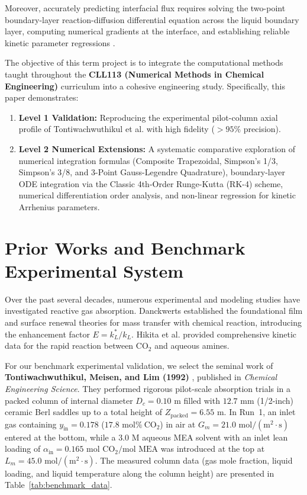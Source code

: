 \documentclass[11pt,a4paper]{article}
\begin{document}
Moreover, accurately predicting interfacial flux requires solving the two-point boundary-layer reaction-diffusion differential equation across the liquid boundary layer, computing numerical gradients at the interface, and establishing reliable kinetic parameter regressions \cite{chapra2015numerical, sarkar2026lecture}.

The objective of this term project is to integrate the computational methods taught throughout the \textbf{CLL113 (Numerical Methods in Chemical Engineering)} curriculum into a cohesive engineering study. Specifically, this paper demonstrates:
\begin{enumerate}
    \item \textbf{Level 1 Validation:} Reproducing the experimental pilot-column axial profile of Tontiwachwuthikul et al. \cite{tontiwachwuthikul1992co2} with high fidelity ($>95\%$ precision).
    \item \textbf{Level 2 Numerical Extensions:} A systematic comparative exploration of numerical integration formulas (Composite Trapezoidal, Simpson's 1/3, Simpson's 3/8, and 3-Point Gauss-Legendre Quadrature), boundary-layer ODE integration via the Classic 4th-Order Runge-Kutta (RK-4) scheme, numerical differentiation order analysis, and non-linear regression for kinetic Arrhenius parameters.
\end{enumerate}

\section{Prior Works and Benchmark Experimental System}
Over the past several decades, numerous experimental and modeling studies have investigated reactive gas absorption. Danckwerts \cite{danckwerts1970gas} established the foundational film and surface renewal theories for mass transfer with chemical reaction, introducing the enhancement factor $E = k_L^* / k_L$. Hikita et al. \cite{hikita1977kinetics} provided comprehensive kinetic data for the rapid reaction between $\text{CO}_2$ and aqueous amines.

For our benchmark experimental validation, we select the seminal work of \textbf{Tontiwachwuthikul, Meisen, and Lim (1992)} \cite{tontiwachwuthikul1992co2}, published in \textit{Chemical Engineering Science}. They performed rigorous pilot-scale absorption trials in a packed column of internal diameter $D_c = 0.10\text{ m}$ filled with $12.7\text{ mm}$ (1/2-inch) ceramic Berl saddles up to a total height of $Z_{\text{packed}} = 6.55\text{ m}$. In Run~1, an inlet gas containing $y_{\text{in}} = 0.178$ ($17.8\text{ mol}\%\ \text{CO}_2$) in air at $G_m = 21.0\text{ mol}/(\text{m}^2\cdot\text{s})$ entered at the bottom, while a $3.0\text{ M}$ aqueous MEA solvent with an inlet lean loading of $\alpha_{\text{in}} = 0.165\text{ mol CO}_2/\text{mol MEA}$ was introduced at the top at $L_m = 45.0\text{ mol}/(\text{m}^2\cdot\text{s})$. The measured column data (gas mole fraction, liquid loading, and liquid temperature along the column height) are presented in Table~\ref{tab:benchmark_data}.
\end{document}
